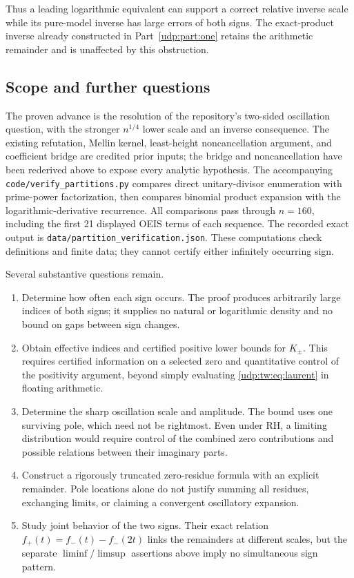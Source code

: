 \documentclass[11pt]{article}
\theoremstyle{remark}\newtheorem{remark}[theorem]{Remark}
\numberwithin{equation}{section}
\begin{document}
Thus a leading logarithmic equivalent can support a correct relative
inverse scale while its pure-model inverse has large errors of both
signs. The exact-product inverse already constructed in
Part~\ref{udp:part:one} retains the arithmetic remainder and is unaffected
by this obstruction.

\subsection{Scope and further questions}\label{udp:tw:sec:scope}

The proven advance is the resolution of the repository's two-sided
oscillation question, with the stronger $n^{1/4}$ lower scale and an
inverse consequence. The existing refutation, Mellin kernel,
least-height noncancellation argument, and coefficient bridge are
credited prior inputs; the bridge and noncancellation have been
rederived above to expose every analytic hypothesis.
The accompanying \texttt{code/verify\_partitions.py} compares direct
unitary-divisor enumeration with prime-power factorization, then
compares binomial product expansion with the logarithmic-derivative
recurrence. All comparisons pass through $n=160$, including the first
21 displayed OEIS terms of each sequence. The recorded exact output is
\texttt{data/partition\_verification.json}. These computations check
definitions and finite data; they cannot certify either infinitely
occurring sign.

Several substantive questions remain.
\begin{enumerate}
\item Determine how often each sign occurs. The proof produces
arbitrarily large indices of both signs; it supplies no natural or
logarithmic density and no bound on gaps between sign changes.
\item Obtain effective indices and certified positive lower bounds
for $K_\pm$. This requires certified information on a selected zero
and quantitative control of the positivity argument, beyond simply
evaluating \eqref{udp:tw:eq:laurent} in floating arithmetic.
\item Determine the sharp oscillation scale and amplitude.
The bound uses one surviving pole, which need not be rightmost.
Even under RH, a limiting distribution would require control of the
combined zero contributions and possible relations between their
imaginary parts.
\item Construct a rigorously truncated zero-residue formula with an
explicit remainder. Pole locations alone do not justify summing
all residues, exchanging limits, or claiming a convergent
oscillatory expansion.
\item Study joint behavior of the two signs. Their exact relation
$f_+(t)=f_-(t)-f_-(2t)$ links the remainders at different scales,
but the separate $\liminf/\limsup$ assertions above imply no
simultaneous sign pattern.
\end{enumerate}
\end{document}
